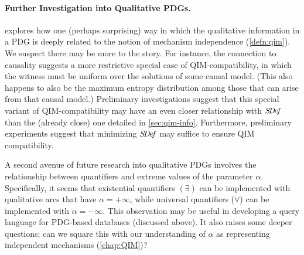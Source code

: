 \paragraph{Further Investigation into Qualitative PDGs.}
 explores how one (perhaps surprising) way in which the qualitative information in a PDG is deeply related to the notion of mechanism independence (\cref{defn:qim}).
We suspect there may be more to the story. 
For instance, the connection to causality suggests a more restrictive special case of QIM-compatibility, in which the witness must be uniform over the solutions
 of some causal model. (This also happens to also be the maximum entropy distribution among those that can arise from that causal model.) 
Preliminary investigations suggest that this special variant of QIM-compatibility may have an even closer relationship with $\mathit{S\mskip-3.5muD\mskip-2.5mue\mskip-1.5muf}$ than the (already close) one detailed in \cref{sec:qim-info}.
Furthermore, preliminary experiments suggest that minimizing $\mathit{S\mskip-3.5muD\mskip-2.5mue\mskip-1.5muf}$ may suffice to ensure QIM compatibility. 

A second avenue of future research into qualitative PDGs involves the relationship between quantifiers and extreme values of the parameter $\alpha$. 
Specifically, it seems that existential quantifiers $(\exists)$ can be implemented with qualitative arcs that have $\alpha = +\infty$, while universal quantifiers ($\forall$) can be implemented with $\alpha = -\infty$. 
This observation may be useful in developing a query language for PDG-based databases (discussed above).
It also raises some deeper questions;
can we square this with our understanding of $\alpha$ as representing independent mechanisms (\cref{chap:QIM})?


